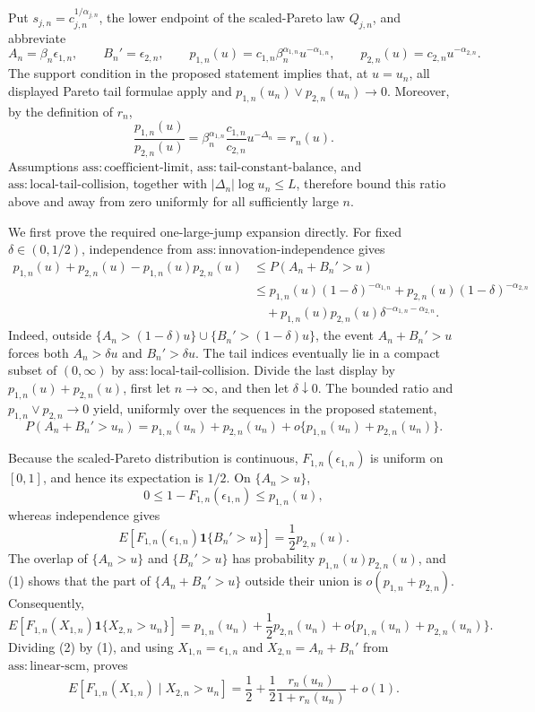 Put \(s_{j,n}=c_{j,n}^{1/\alpha_{j,n}}\), the lower endpoint of the scaled-Pareto law \(Q_{j,n}\), and abbreviate
\[
 A_n=\beta_n\epsilon_{1,n},\qquad B_n'=\epsilon_{2,n},\qquad
 p_{1,n}(u)=c_{1,n}\beta_n^{\alpha_{1,n}}u^{-\alpha_{1,n}},
 \qquad p_{2,n}(u)=c_{2,n}u^{-\alpha_{2,n}}.
\]
The support condition in the proposed statement implies that, at \(u=u_n\), all displayed Pareto tail formulae apply and \(p_{1,n}(u_n)\vee p_{2,n}(u_n)\to0\).  Moreover, by the definition of \(r_n\),
\[
 \frac{p_{1,n}(u)}{p_{2,n}(u)}
 =\beta_n^{\alpha_{1,n}}\frac{c_{1,n}}{c_{2,n}}u^{-\Delta_n}
 =r_n(u).
\]
Assumptions \(\mathrm{ass{:}coefficient\text{-}limit}\), \(\mathrm{ass{:}tail\text{-}constant\text{-}balance}\), and \(\mathrm{ass{:}local\text{-}tail\text{-}collision}\), together with \(|\Delta_n|\log u_n\leq L\), therefore bound this ratio above and away from zero uniformly for all sufficiently large \(n\).

We first prove the required one-large-jump expansion directly.  For fixed \(\delta\in(0,1/2)\), independence from \(\mathrm{ass{:}innovation\text{-}independence}\) gives
\[
\begin{split}
 p_{1,n}(u)+p_{2,n}(u)-p_{1,n}(u)p_{2,n}(u)
 &\leq P(A_n+B_n'>u)\\
 &\leq p_{1,n}(u)(1-\delta)^{-\alpha_{1,n}}
      +p_{2,n}(u)(1-\delta)^{-\alpha_{2,n}}\\
 &\quad +p_{1,n}(u)p_{2,n}(u)\delta^{-\alpha_{1,n}-\alpha_{2,n}}.
\end{split}
\]
Indeed, outside \(\{A_n>(1-\delta)u\}\cup\{B_n'>(1-\delta)u\}\), the event \(A_n+B_n'>u\) forces both \(A_n>\delta u\) and \(B_n'>\delta u\).  The tail indices eventually lie in a compact subset of \((0,\infty)\) by \(\mathrm{ass{:}local\text{-}tail\text{-}collision}\).  Divide the last display by \(p_{1,n}(u)+p_{2,n}(u)\), first let \(n\to\infty\), and then let \(\delta\downarrow0\).  The bounded ratio and \(p_{1,n}\vee p_{2,n}\to0\) yield, uniformly over the sequences in the proposed statement,
\[
 P(A_n+B_n'>u_n)=p_{1,n}(u_n)+p_{2,n}(u_n)
 +o\{p_{1,n}(u_n)+p_{2,n}(u_n)\}. \tag{1}
\]

Because the scaled-Pareto distribution is continuous, \(F_{1,n}(\epsilon_{1,n})\) is uniform on \([0,1]\), and hence its expectation is \(1/2\).  On \(\{A_n>u\}\),
\[
 0\leq 1-F_{1,n}(\epsilon_{1,n})
 \leq p_{1,n}(u),
\]
whereas independence gives
\[
 E\!\left[F_{1,n}(\epsilon_{1,n})\mathbf 1\{B_n'>u\}\right]
 =\frac12p_{2,n}(u).
\]
The overlap of \(\{A_n>u\}\) and \(\{B_n'>u\}\) has probability \(p_{1,n}(u)p_{2,n}(u)\), and (1) shows that the part of \(\{A_n+B_n'>u\}\) outside their union is \(o(p_{1,n}+p_{2,n})\).  Consequently,
\[
 E\!\left[F_{1,n}(X_{1,n})\mathbf 1\{X_{2,n}>u_n\}\right]
 =p_{1,n}(u_n)+\frac12p_{2,n}(u_n)
 +o\{p_{1,n}(u_n)+p_{2,n}(u_n)\}. \tag{2}
\]
Dividing (2) by (1), and using \(X_{1,n}=\epsilon_{1,n}\) and \(X_{2,n}=A_n+B_n'\) from \(\mathrm{ass{:}linear\text{-}scm}\), proves
\[
 E[F_{1,n}(X_{1,n})\mid X_{2,n}>u_n]
 =\frac12+\frac12\frac{r_n(u_n)}{1+r_n(u_n)}+o(1). \tag{3}
\]

